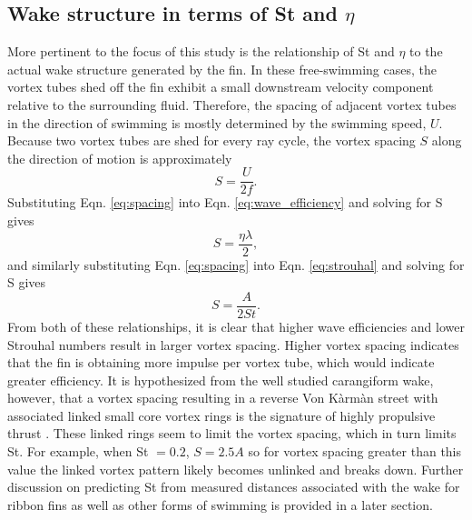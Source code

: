 \documentclass[onecolumn]{IEEEtran}
\begin{document}
\subsection{Wake structure in terms of St and $\eta$}

More pertinent to the focus of this study is the relationship of St and
$\eta$ to the actual wake structure generated by the fin.
In these free-swimming cases, the vortex tubes shed off the fin exhibit a 
small downstream velocity component relative to the surrounding fluid.
Therefore, the spacing of adjacent vortex tubes in the direction of
swimming is mostly determined by the swimming speed, $U$. Because two
vortex tubes are shed for every ray cycle, the vortex spacing $S$ along the direction of motion is approximately
\begin{equation} S = \frac{U}{2 f} \label{eq:spacing}.
\end{equation}
Substituting Eqn. \ref{eq:spacing} into Eqn. \ref{eq:wave_efficiency} and
solving for S gives
\begin{equation} S = \frac{\eta \lambda}{2} \label{eq:spacing_eta},
\end{equation}
and similarly substituting Eqn. \ref{eq:spacing} into Eqn.
\ref{eq:strouhal} and solving for S gives
\begin{equation} S = \frac{A}{2 St} \label{eq:spacing_st}.
\end{equation}
From both of these relationships, it is clear that higher wave
efficiencies and lower Strouhal numbers result in larger vortex spacing.
Higher vortex spacing indicates that the fin is obtaining more impulse per
vortex tube, which would indicate greater efficiency. It is hypothesized from
the well studied carangiform wake, however, that a vortex spacing resulting in
a reverse Von K\`arm\`an street with associated linked small core vortex
rings is the signature of highly propulsive thrust \citep*{Naue02b}. These
linked rings seem to limit the vortex spacing, which in turn limits St.
For example, when St $=0.2$, $S = 2.5A$ so for vortex spacing greater than
this value the linked vortex pattern likely becomes unlinked and breaks down.
Further discussion on predicting St from measured distances associated 
with the wake for ribbon fins as well as other forms of swimming is provided in a later section.
\end{document}
